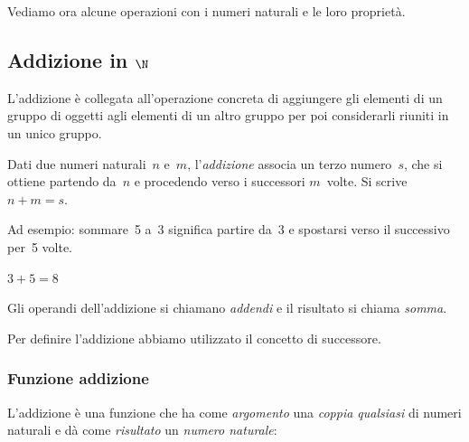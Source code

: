Vediamo ora alcune operazioni con i numeri naturali e le loro proprietà.

\subsection{Addizione in $\N$}

L'addizione è collegata all'operazione concreta di aggiungere gli elementi di 
un gruppo di oggetti agli elementi di un altro gruppo per poi considerarli 
riuniti in un unico gruppo.

\begin{definizione}{}{}
  Dati due numeri naturali~\(n\) e~\(m\), l'\emph{addizione} associa un terzo 
  numero~\(s\), che si ottiene partendo da~\(n\) e procedendo verso i 
  successori \(m\)~volte. Si scrive~\(n+m=s\).
\end{definizione}

Ad esempio: sommare~5 a~3 significa partire da~3 e spostarsi verso il 
successivo per~5 volte.

\begin{minipage}{0.80\textwidth}
 \centering
 \(3+5=8\)

\addline
%  
\end{minipage}%
\begin{minipage}{0.15\textwidth}
 \centering
\begin{inaccessibleblock}
\end{inaccessibleblock}
\end{minipage}%

Gli operandi dell'addizione si chiamano \emph{addendi} e il risultato si 
chiama \emph{somma}.

\begin{osservazione}{}{}
Per definire l'addizione abbiamo utilizzato il concetto di successore.
\end{osservazione}

\subsubsection{Funzione addizione}

L'addizione è una funzione che ha come \emph{argomento} una \emph{coppia 
qualsiasi} di numeri naturali e dà come \emph{risultato} un \emph{numero 
naturale}:

